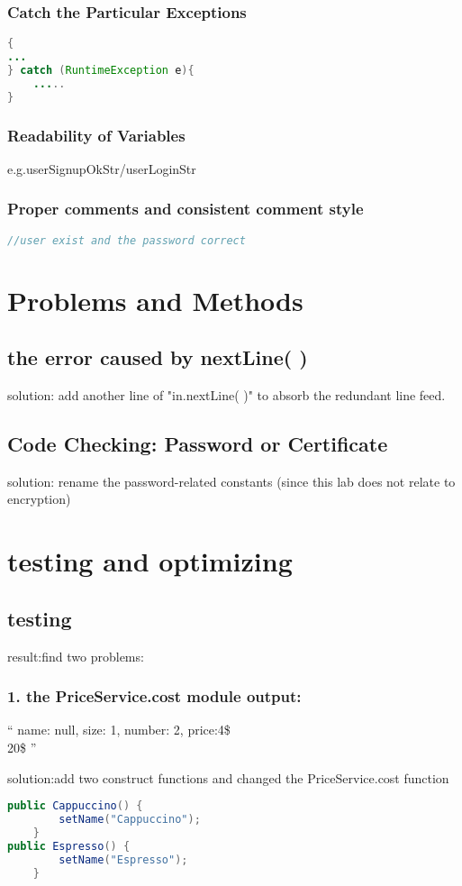 \documentclass[./report.tex]{subfiles}
\begin{document}
  \subsubsection{Catch the Particular Exceptions }
  \begin{lstlisting}[language=java]
{
...
} catch (RuntimeException e){
	.....
}
\end{lstlisting}
  
    \subsubsection{Readability of Variables}
    \par e.g.userSignupOkStr/userLoginStr
    
 \subsubsection{Proper comments and consistent comment style}
   \begin{lstlisting}[language=java]
//user exist and the password correct
\end{lstlisting}   
\section{Problems and Methods}
    \subsection{the error caused by nextLine( )}
    \par solution: add another line of "in.nextLine( )" to absorb the redundant line feed.
    \subsection{Code Checking: Password or Certificate }
    \par solution: rename the password-related constants (since this lab does not relate to encryption)


\section{testing and optimizing}
	\subsection{testing}
	\par result:find two problems: 
		\subsubsection{1. the PriceService.cost module output:}
		\par `` name: null, size: 1, number: 2, price:4\$ \\ 20\$  ''
		\par 	solution:add two construct functions and changed the PriceService.cost function
		\par
  \begin{lstlisting}[language=java]
public Cappuccino() {
        setName("Cappuccino");
    }
public Espresso() {
        setName("Espresso");
    }
\end{lstlisting}
\end{document}
